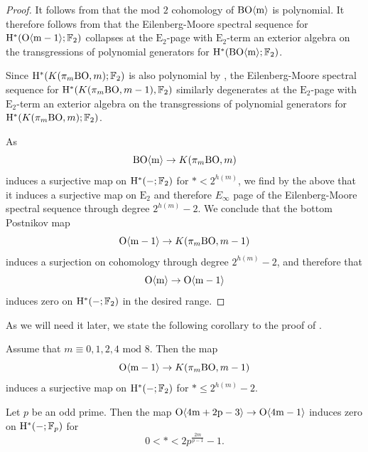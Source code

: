 \begin{proof}
    It follows from  that the mod $2$ cohomology of $\mathrm{BO \langle m \rangle}$ is polynomial. It therefore follows from \cite[Part II, Corollary 3.2]{SmithEM} that the Eilenberg-Moore spectral sequence for $\mathrm{H}^*(\mathrm{O}\mathrm{\langle m-1 \rangle}; \operatorname{\mathbb{F}}_2)$ collapses at the $\mathrm{E}_2$-page with $\mathrm{E}_2$-term an exterior algebra on the transgressions of polynomial generators for $\mathrm{H}^*(\mathrm{BO \langle m \rangle}; \operatorname{\mathbb{F}}_2)$.

    Since $\mathrm{H}^*(K(\pi_m \mathrm{BO}, m); \operatorname{\mathbb{F}}_2)$ is also polynomial by \cite[Th\'{e}or\`{e}mes 2 and 3]{SerreCohEM}, the Eilenberg-Moore spectral sequence for $\mathrm{H}^* (K(\pi_m \mathrm{BO}, m-1), \operatorname{\mathbb{F}}_2)$ similarly degenerates at the $\mathrm{E}_2$-page with $\mathrm{E}_2$-term an exterior algebra on the transgressions of polynomial generators for $\mathrm{H}^*(K(\pi_m \mathrm{BO}, m); \operatorname{\mathbb{F}}_2)$.

    As \[\mathrm{BO \langle m \rangle} \to K(\pi_m \mathrm{BO}, m) \] induces a surjective map on $\mathrm{H}^* (-; \operatorname{\mathbb{F}}_2)$ for $* < 2^{h(m)}$, we find by the above that it induces a surjective map on $\mathrm{E}_2$ and therefore $E_{\infty}$ page of the Eilenberg-Moore spectral sequence through degree $2^{h(m)} - 2$. We conclude that the bottom Postnikov map \[\mathrm{O}\mathrm{\langle m-1 \rangle} \to K(\pi_m \mathrm{BO}, m-1)\] induces a surjection on cohomology through degree $2^{h(m)} - 2$, and therefore that \[\mathrm{O} \mathrm{\langle m \rangle} \to \mathrm{O \langle m -1 \rangle}\] induces zero on $\mathrm{H}^* (-; \operatorname{\mathbb{F}}_2)$ in the desired range.
\end{proof}

As we will need it later, we state the following corollary to the proof of .

\begin{cor}\label{cor:coh-surj-range}
    Assume that $m \equiv 0,1,2,4 \text{ mod } 8$. Then the map \[\mathrm{O}\mathrm{\langle m - 1\rangle} \to K(\pi_m \mathrm{BO}, m-1)\] induces a surjective map on $\mathrm{H}^*(-;\operatorname{\mathbb{F}}_2)$ for $* \leq 2^{h(m)} - 2$.
\end{cor}

\begin{cor}\label{cor:zerocohmapp}
	Let $p$ be an odd prime. Then the map $\mathrm{O}\mathrm{\langle 4m+2p-3 \rangle} \to \mathrm{O} \mathrm{\langle 4m-1 \rangle}$ induces zero on $\mathrm{H}^* (-; \operatorname{\mathbb{F}}_p)$ for \[0 < * < 2p^{\frac{2m}{p-1}} - 1.\]
\end{cor}

